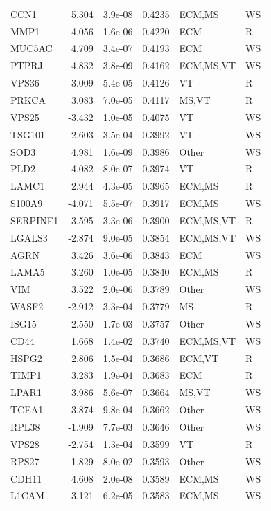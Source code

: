 \begin{table}[ht]
\begin{tabular}{lrlrll}
  CCN1 & 5.304 & 3.9e-08 & 0.4235 & ECM,MS & WS \\ 
  MMP1 & 4.056 & 1.6e-06 & 0.4220 & ECM & R \\ 
  MUC5AC & 4.709 & 3.4e-07 & 0.4193 & ECM & WS \\ 
  PTPRJ & 4.832 & 3.8e-09 & 0.4162 & ECM,MS,VT & WS \\ 
  VPS36 & -3.009 & 5.4e-05 & 0.4126 & VT & R \\ 
  PRKCA & 3.083 & 7.0e-05 & 0.4117 & MS,VT & R \\ 
  VPS25 & -3.432 & 1.0e-05 & 0.4075 & VT & WS \\ 
  TSG101 & -2.603 & 3.5e-04 & 0.3992 & VT & WS \\ 
  SOD3 & 4.981 & 1.6e-09 & 0.3986 & Other & WS \\ 
  PLD2 & -4.082 & 8.0e-07 & 0.3974 & VT & R \\ 
  LAMC1 & 2.944 & 4.3e-05 & 0.3965 & ECM,MS & R \\ 
  S100A9 & -4.071 & 5.5e-07 & 0.3917 & ECM,MS & WS \\ 
  SERPINE1 & 3.595 & 3.3e-06 & 0.3900 & ECM,MS,VT & R \\ 
  LGALS3 & -2.874 & 9.0e-05 & 0.3854 & ECM,MS,VT & WS \\ 
  AGRN & 3.426 & 3.6e-06 & 0.3843 & ECM & WS \\ 
  LAMA5 & 3.260 & 1.0e-05 & 0.3840 & ECM,MS & R \\ 
  VIM & 3.522 & 2.0e-06 & 0.3789 & Other & WS \\ 
  WASF2 & -2.912 & 3.3e-04 & 0.3779 & MS & R \\ 
  ISG15 & 2.550 & 1.7e-03 & 0.3757 & Other & WS \\ 
  CD44 & 1.668 & 1.4e-02 & 0.3740 & ECM,MS,VT & WS \\ 
  HSPG2 & 2.806 & 1.5e-04 & 0.3686 & ECM,VT & R \\ 
  TIMP1 & 3.283 & 1.9e-04 & 0.3683 & ECM & R \\ 
  LPAR1 & 3.986 & 5.6e-07 & 0.3664 & MS,VT & WS \\ 
  TCEA1 & -3.874 & 9.8e-04 & 0.3662 & Other & WS \\ 
  RPL38 & -1.909 & 7.7e-03 & 0.3646 & Other & WS \\ 
  VPS28 & -2.754 & 1.3e-04 & 0.3599 & VT & R \\ 
  RPS27 & -1.829 & 8.0e-02 & 0.3593 & Other & WS \\ 
  CDH11 & 4.608 & 2.0e-08 & 0.3589 & ECM,MS & WS \\ 
  L1CAM & 3.121 & 6.2e-05 & 0.3583 & ECM,MS & WS \\ 

\end{tabular}
\end{table}
